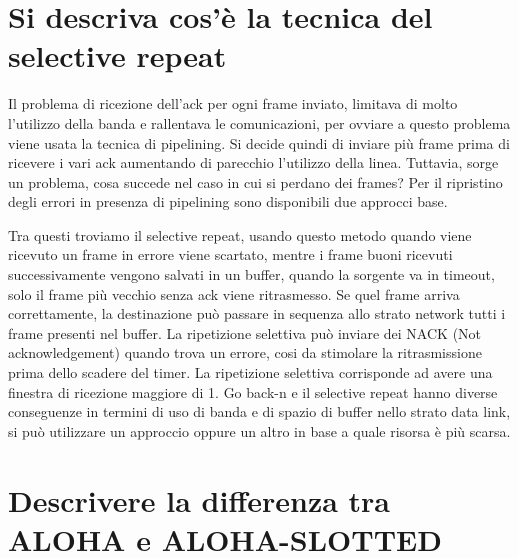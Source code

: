 \section{Si descriva cos'è la tecnica del selective repeat}

Il problema di ricezione dell’ack per ogni frame inviato, limitava di molto l’utilizzo della banda e rallentava le comunicazioni, per ovviare a questo problema viene usata la tecnica di pipelining. Si decide quindi di inviare più frame prima di ricevere i vari ack aumentando di parecchio l’utilizzo della linea. Tuttavia, sorge un problema, cosa succede nel caso in cui si perdano dei frames? Per il ripristino degli errori in presenza di pipelining sono disponibili due approcci base.

Tra questi troviamo il selective repeat, usando questo metodo quando viene ricevuto un frame in errore viene scartato, mentre i frame buoni ricevuti successivamente vengono salvati in un buffer, quando la sorgente va in timeout, solo il frame più vecchio senza ack viene ritrasmesso. Se quel frame arriva correttamente, la destinazione può passare in sequenza allo strato network tutti i frame presenti nel buffer.
La ripetizione selettiva può inviare dei NACK (Not acknowledgement) quando trova un errore, cosi da stimolare la ritrasmissione prima dello scadere del timer.
La ripetizione selettiva corrisponde ad avere una finestra di ricezione maggiore di 1.
Go back-n e il selective repeat hanno diverse conseguenze in termini di uso di banda e di spazio di buffer nello strato data link, si può utilizzare un approccio oppure un altro in base a quale risorsa è più scarsa.
 
\section{Descrivere la differenza tra ALOHA e ALOHA-SLOTTED}

